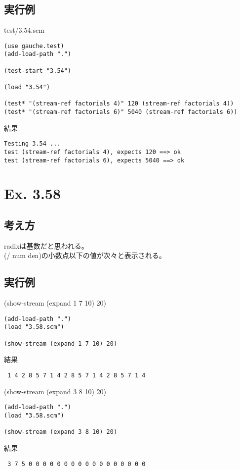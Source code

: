 \documentclass[a4paper,12pt]{article}
\begin{document}
\subsection{実行例}
test/3.54.scm\\
{\small
\begin{verbatim}
(use gauche.test)
(add-load-path ".")

(test-start "3.54")

(load "3.54")

(test* "(stream-ref factorials 4)" 120 (stream-ref factorials 4))
(test* "(stream-ref factorials 6)" 5040 (stream-ref factorials 6))
\end{verbatim}
}
結果\\
{\small
\begin{verbatim}
Testing 3.54 ...                                                 
test (stream-ref factorials 4), expects 120 ==> ok
test (stream-ref factorials 6), expects 5040 ==> ok
\end{verbatim}
}

\section{Ex. 3.58}
\subsection{考え方}
radixは基数だと思われる。\\
(/ num den)の小数点以下の値が次々と表示される。\\
\subsection{実行例}
(show-stream (expand 1 7 10) 20)\\
{\small
\begin{verbatim}
(add-load-path ".")
(load "3.58.scm")

(show-stream (expand 1 7 10) 20)
\end{verbatim}
}
結果\\
{\small
\begin{verbatim}
 1 4 2 8 5 7 1 4 2 8 5 7 1 4 2 8 5 7 1 4
\end{verbatim}
}
(show-stream (expand 3 8 10) 20)\\
{\small
\begin{verbatim}
(add-load-path ".")
(load "3.58.scm")

(show-stream (expand 3 8 10) 20)
\end{verbatim}
}
結果\\
{\small
\begin{verbatim}
 3 7 5 0 0 0 0 0 0 0 0 0 0 0 0 0 0 0 0 0
\end{verbatim}
}
\end{document}
